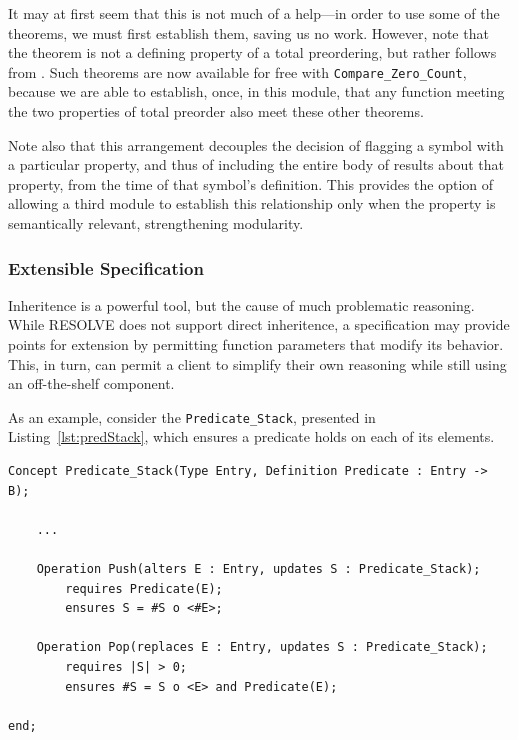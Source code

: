 It may at first seem that this is not much of a help---in order to use some of the theorems, we must first establish them, saving us no work.  However, note that the \texttt{} theorem is not a defining property of a total preordering, but rather follows from \texttt{\totalTheorem}.  Such theorems are now available for free with \texttt{Compare\_Zero\_Count}, because we are able to establish, once, in this module, that any function meeting the two properties of total preorder also meet these other theorems.

Note also that this arrangement decouples the decision of flagging a symbol with a particular property, and thus of including the entire body of results about that property, from the time of that symbol's definition.  This provides the option of allowing a third module to establish this relationship only when the property is semantically relevant, strengthening modularity.

		\subsubsection{Extensible Specification\label{extensibleSpecification}}

Inheritence is a powerful tool, but the cause of much problematic reasoning\cite{vlissides1995design}.  While RESOLVE does not support direct inheritence, a specification may provide points for extension by permitting function parameters that modify its behavior.  This, in turn, can permit a client to simplify their own reasoning while still using an off-the-shelf component.

As an example, consider the \texttt{Predicate\_Stack}, presented in Listing~\ref{lst:predStack}, which ensures a predicate holds on each of its elements.

\begin{lstlisting}[float=h,language=resolve,caption={A partial specification for \texttt{Predicate\_Stack}\label{lst:predStack}}]
Concept Predicate_Stack(Type Entry, Definition Predicate : Entry -> B);

	...

	Operation Push(alters E : Entry, updates S : Predicate_Stack);
		requires Predicate(E);
		ensures S = #S o <#E>;

	Operation Pop(replaces E : Entry, updates S : Predicate_Stack);
		requires |S| > 0;
		ensures #S = S o <E> and Predicate(E);

end;
\end{lstlisting}


